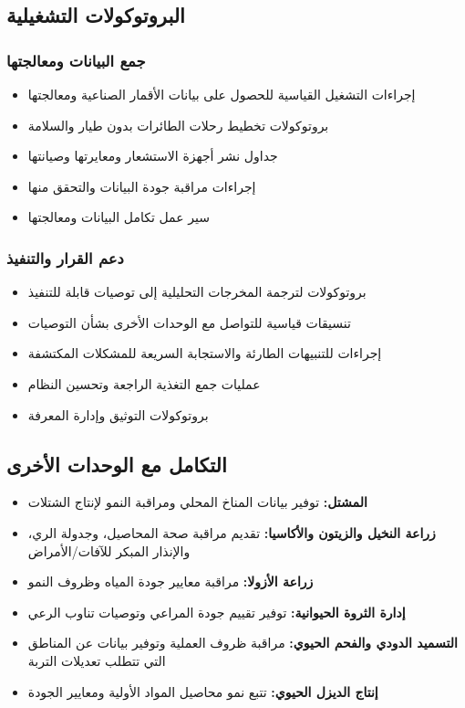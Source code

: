 \subsection{البروتوكولات التشغيلية}

\subsubsection{جمع البيانات ومعالجتها}
\begin{itemize}
    \item إجراءات التشغيل القياسية للحصول على بيانات الأقمار الصناعية ومعالجتها
    \item بروتوكولات تخطيط رحلات الطائرات بدون طيار والسلامة
    \item جداول نشر أجهزة الاستشعار ومعايرتها وصيانتها
    \item إجراءات مراقبة جودة البيانات والتحقق منها
    \item سير عمل تكامل البيانات ومعالجتها
\end{itemize}

\subsubsection{دعم القرار والتنفيذ}
\begin{itemize}
    \item بروتوكولات لترجمة المخرجات التحليلية إلى توصيات قابلة للتنفيذ
    \item تنسيقات قياسية للتواصل مع الوحدات الأخرى بشأن التوصيات
    \item إجراءات للتنبيهات الطارئة والاستجابة السريعة للمشكلات المكتشفة
    \item عمليات جمع التغذية الراجعة وتحسين النظام
    \item بروتوكولات التوثيق وإدارة المعرفة
\end{itemize}

\subsection{التكامل مع الوحدات الأخرى}
\begin{itemize}
    \item \textbf{المشتل:} توفير بيانات المناخ المحلي ومراقبة النمو لإنتاج الشتلات
    
    \item \textbf{زراعة النخيل والزيتون والأكاسيا:} تقديم مراقبة صحة المحاصيل، وجدولة الري، والإنذار المبكر للآفات/الأمراض
    
    \item \textbf{زراعة الأزولا:} مراقبة معايير جودة المياه وظروف النمو
    
    \item \textbf{إدارة الثروة الحيوانية:} توفير تقييم جودة المراعي وتوصيات تناوب الرعي
    
    \item \textbf{التسميد الدودي والفحم الحيوي:} مراقبة ظروف العملية وتوفير بيانات عن المناطق التي تتطلب تعديلات التربة
    
    \item \textbf{إنتاج الديزل الحيوي:} تتبع نمو محاصيل المواد الأولية ومعايير الجودة
\end{itemize} 